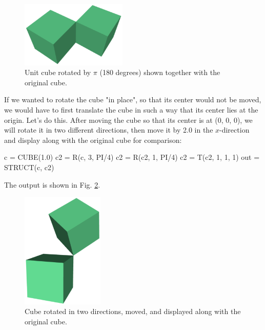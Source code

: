 \begin{figure}[!ht]
\begin{center}
\includegraphics[width=0.45\textwidth]{img/rot-1.png}
\end{center}
\vspace{-4mm}
\caption{Unit cube rotated by $\pi$ (180 degrees) shown together with the original cube.}
\label{fig:rot-1}
\end{figure}
\noindent
If we wanted to 
rotate the cube "in place", so that its center would not be moved,
we would have to first translate the cube in such a way that its center
lies at the origin. Let's do this. After moving the cube so that 
its center is at (0, 0, 0), we will rotate it in two different directions,
then move it by 2.0 in the $x$-direction and display along with 
the original cube for comparison:

\begin{bluecode}
c = CUBE(1.0)
c2 = R(c, 3, PI/4)
c2 = R(c2, 1, PI/4)
c2 = T(c2, 1, 1, 1)
out = STRUCT(c, c2)
\end{bluecode}
The output is shown in Fig. \ref{fig:rot-2}.
\newpage

\begin{figure}[!ht]
\begin{center}
\includegraphics[width=0.35\textwidth]{img/rot-2.png}
\end{center}
\vspace{-4mm}
\caption{Cube rotated in two directions, moved, and displayed along with the original cube.}
\label{fig:rot-2}
\end{figure}

